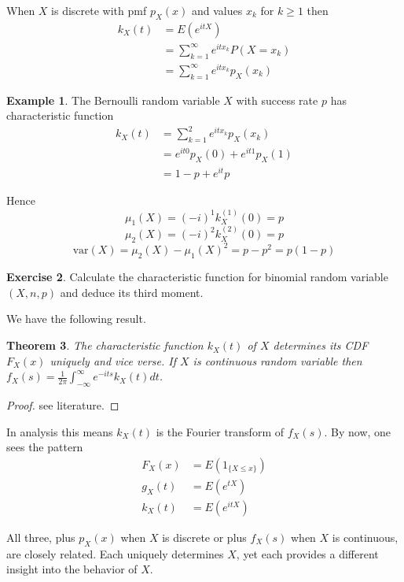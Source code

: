 \documentclass[12pt]{amsart}
\newtheorem{theorem}{Theorem}[section]
\theoremstyle{definition}
\newtheorem{example}[theorem]{Example}
\newtheorem{exercise}[theorem]{Exercise}
\begin{document}
When $X$ is discrete with pmf $p_X(x)$ and values $x_k$ for $k \geq 1$ then
\begin{align*}
k_X(t) & = E(e^{itX}) \\
 & = \sum\limits_{k=1}^{\infty} e^{i t x_k}P(X = x_k) \\
 & = \sum\limits_{k=1}^{\infty} e^{i t x_k}p_X(x_k)
\end{align*}

\begin{example} The Bernoulli random variable $X$ with success rate $p$ has characteristic function
\begin{align*}
k_X(t) & = \sum\limits_{k=1}^2 e^{i t x_k}p_X(x_k) \\
 & = e^{it0}p_X(0) + e^{it1}p_X(1) \\
 & = 1 - p + e^{it}p
\end{align*}

Hence
$$\mu_1(X) = (-i)^1k_X^{(1)}(0) = p$$
$$\mu_2(X) = (-i)^2k_X^{(2)}(0) = p$$
$$\text{var}(X) = \mu_2(X) - \mu_1(X)^2 = p - p^2 = p(1 - p)$$
\end{example}

\begin{exercise} Calculate the characteristic function for binomial random variable $(X, n, p)$ and deduce its third moment.
\end{exercise}

We have the following result.

\begin{theorem} The characteristic function $k_X(t)$ of $X$ determines its CDF $F_X(x)$ uniquely and vice verse. If $X$ is continuous random variable then $f_X(s) = \frac{1}{2\pi} \int_{-\infty}^{\infty} e^{-its} k_X(t) dt$.
\end{theorem}
\begin{proof} see literature.
\end{proof}

In analysis this means $k_X(t)$ is the Fourier transform of $f_X(s)$. By now, one sees the pattern
\begin{align*}
F_X(x) & = E(1_{\{X \leq x\}}) \\
g_X(t) & = E(e^{tX}) \\
k_X(t) & = E(e^{itX})
\end{align*}

All three, plus $p_X(x)$ when $X$ is discrete or plus $f_X(s)$ when $X$ is continuous, are closely related. Each uniquely determines $X$, yet each provides a different insight into the behavior of $X$.
\end{document}
